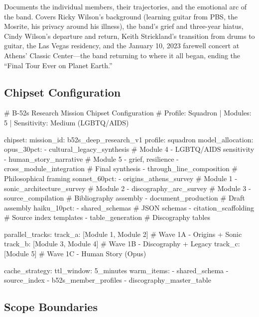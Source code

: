 \documentclass[11pt,letterpaper]{article}
\begin{document}
Documents the individual members, their trajectories, and the emotional arc of the band. Covers Ricky Wilson's background (learning guitar from PBS, the Mosrite, his privacy around his illness), the band's grief and three-year hiatus, Cindy Wilson's departure and return, Keith Strickland's transition from drums to guitar, the Las Vegas residency, and the January 10, 2023 farewell concert at Athens' Classic Center---the band returning to where it all began, ending the ``Final Tour Ever on Planet Earth.''

\subsection{Chipset Configuration}

\begin{asciibox}
# B-52s Research Mission Chipset Configuration
# Profile: Squadron | Modules: 5 | Sensitivity: Medium (LGBTQ/AIDS)

chipset:
  mission_id: b52s_deep_research_v1
  profile: squadron
  model_allocation:
    opus_30pct:
      - cultural_legacy_synthesis       # Module 4 - LGBTQ/AIDS sensitivity
      - human_story_narrative           # Module 5 - grief, resilience
      - cross_module_integration        # Final synthesis
      - through_line_composition        # Philosophical framing
    sonnet_60pct:
      - origins_athens_survey           # Module 1
      - sonic_architecture_survey       # Module 2
      - discography_arc_survey          # Module 3
      - source_compilation              # Bibliography assembly
      - document_production             # Draft assembly
    haiku_10pct:
      - shared_schemas                  # JSON schemas
      - citation_scaffolding            # Source index templates
      - table_generation                # Discography tables

  parallel_tracks:
    track_a: [Module 1, Module 2]       # Wave 1A - Origins + Sonic
    track_b: [Module 3, Module 4]       # Wave 1B - Discography + Legacy
    track_c: [Module 5]                 # Wave 1C - Human Story (Opus)

  cache_strategy:
    ttl_window: 5_minutes
    warm_items:
      - shared_schema
      - source_index
      - b52s_member_profiles
      - discography_master_table
\end{asciibox}

\subsection{Scope Boundaries}
\end{document}
